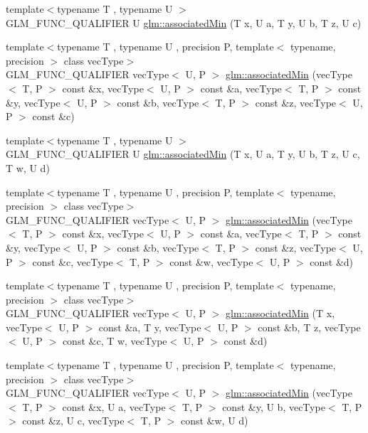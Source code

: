 \begin{DoxyCompactItemize}
{\footnotesize template$<$typename T , typename U $>$ }\\G\-L\-M\-\_\-\-F\-U\-N\-C\-\_\-\-Q\-U\-A\-L\-I\-F\-I\-E\-R U \hyperlink{group__gtx__associated__min__max_gad0aa8f86259a26d839d34a3577a923fc}{glm\-::associated\-Min} (T x, U a, T y, U b, T z, U c)
\item 
{\footnotesize template$<$typename T , typename U , precision P, template$<$ typename, precision $>$ class vec\-Type$>$ }\\G\-L\-M\-\_\-\-F\-U\-N\-C\-\_\-\-Q\-U\-A\-L\-I\-F\-I\-E\-R vec\-Type$<$ U, P $>$ \hyperlink{group__gtx__associated__min__max_ga5bc6b9acbf9e060d58a342fbe3b73d43}{glm\-::associated\-Min} (vec\-Type$<$ T, P $>$ const \&x, vec\-Type$<$ U, P $>$ const \&a, vec\-Type$<$ T, P $>$ const \&y, vec\-Type$<$ U, P $>$ const \&b, vec\-Type$<$ T, P $>$ const \&z, vec\-Type$<$ U, P $>$ const \&c)
\item 
{\footnotesize template$<$typename T , typename U $>$ }\\G\-L\-M\-\_\-\-F\-U\-N\-C\-\_\-\-Q\-U\-A\-L\-I\-F\-I\-E\-R U \hyperlink{group__gtx__associated__min__max_ga432224ebe2085eaa2b63a077ecbbbff6}{glm\-::associated\-Min} (T x, U a, T y, U b, T z, U c, T w, U d)
\item 
{\footnotesize template$<$typename T , typename U , precision P, template$<$ typename, precision $>$ class vec\-Type$>$ }\\G\-L\-M\-\_\-\-F\-U\-N\-C\-\_\-\-Q\-U\-A\-L\-I\-F\-I\-E\-R vec\-Type$<$ U, P $>$ \hyperlink{group__gtx__associated__min__max_ga88e031f22b80215505928900d3dde549}{glm\-::associated\-Min} (vec\-Type$<$ T, P $>$ const \&x, vec\-Type$<$ U, P $>$ const \&a, vec\-Type$<$ T, P $>$ const \&y, vec\-Type$<$ U, P $>$ const \&b, vec\-Type$<$ T, P $>$ const \&z, vec\-Type$<$ U, P $>$ const \&c, vec\-Type$<$ T, P $>$ const \&w, vec\-Type$<$ U, P $>$ const \&d)
\item 
{\footnotesize template$<$typename T , typename U , precision P, template$<$ typename, precision $>$ class vec\-Type$>$ }\\G\-L\-M\-\_\-\-F\-U\-N\-C\-\_\-\-Q\-U\-A\-L\-I\-F\-I\-E\-R vec\-Type$<$ U, P $>$ \hyperlink{group__gtx__associated__min__max_ga0f63b0dce5a5c3242cc6d9847e7d14f1}{glm\-::associated\-Min} (T x, vec\-Type$<$ U, P $>$ const \&a, T y, vec\-Type$<$ U, P $>$ const \&b, T z, vec\-Type$<$ U, P $>$ const \&c, T w, vec\-Type$<$ U, P $>$ const \&d)
\item 
{\footnotesize template$<$typename T , typename U , precision P, template$<$ typename, precision $>$ class vec\-Type$>$ }\\G\-L\-M\-\_\-\-F\-U\-N\-C\-\_\-\-Q\-U\-A\-L\-I\-F\-I\-E\-R vec\-Type$<$ U, P $>$ \hyperlink{group__gtx__associated__min__max_ga00a949fd345f4b31b259f033d3ab4a1c}{glm\-::associated\-Min} (vec\-Type$<$ T, P $>$ const \&x, U a, vec\-Type$<$ T, P $>$ const \&y, U b, vec\-Type$<$ T, P $>$ const \&z, U c, vec\-Type$<$ T, P $>$ const \&w, U d)

\end{DoxyCompactItemize}
